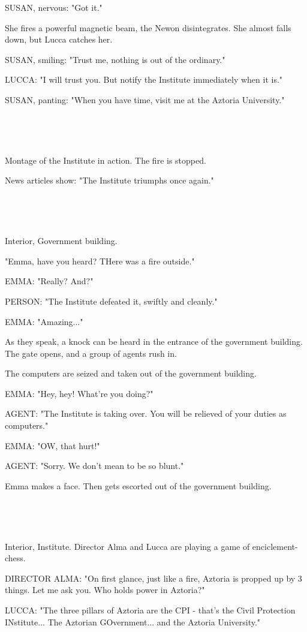\documentclass[11pt]{article}
\begin{document}
SUSAN, nervous: "Got it."

She fires a powerful magnetic beam, the Newon disintegrates.
She almost falls down, but Lucca catches her.

SUSAN, smiling: "Trust me, nothing is out of the ordinary."

LUCCA: "I will trust you.
But notify the Institute immediately when it is."

SUSAN, panting: "When you have time, visit me at the Aztoria University."

\ 

\ 

Montage of the Institute in action.
The fire is stopped.

News articles show: "The Institute triumphs once again."

\ 

\ 

Interior, Government building.

"Emma, have you heard? THere was a fire outside."

EMMA: "Really? And?"

PERSON: "The Institute defeated it, swiftly and cleanly."

EMMA: "Amazing..."

As they speak, a knock can be heard in the entrance of the government building.
The gate opens, and a group of agents rush in.

The computers are seized and taken out of the government building.

EMMA: "Hey, hey! What're you doing?"

AGENT: "The Institute is taking over. 
You will be relieved of your duties as computers."

EMMA: "OW, that hurt!"

AGENT: "Sorry. We don't mean to be so blunt."

Emma makes a face. Then gets escorted out of the government building.

\ 

\ 

Interior, Institute.
Director Alma and Lucca are playing a game of enciclement-chess.

DIRECTOR ALMA: "On first glance, just like a fire, Aztoria is propped up by 3 things.
Let me ask you. 
Who holds power in Aztoria?"

LUCCA: "The three pillars of Aztoria are the CPI - that's the Civil Protection INstitute... The Aztorian GOvernment... and the Aztoria University."
\end{document}
